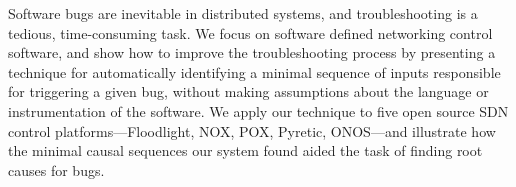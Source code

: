 Software bugs are inevitable in distributed systems,
and troubleshooting
is a tedious, time-consuming task. We focus on software defined
networking control software, and show how to improve
the troubleshooting process by presenting a technique
for automatically identifying
a minimal sequence of inputs responsible for triggering a given bug, without
making assumptions about the language or instrumentation of the
software. We apply our technique to five open source SDN control
platforms---Floodlight, NOX, POX, Pyretic, ONOS---and
illustrate how the minimal causal sequences our system found aided the
task of finding root causes for bugs.
